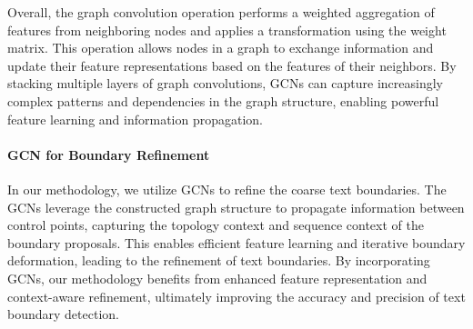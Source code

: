 Overall, the graph convolution operation performs a weighted aggregation of features from neighboring nodes and applies a transformation using the weight matrix. This operation allows nodes in a graph to exchange information and update their feature representations based on the features of their neighbors. By stacking multiple layers of graph convolutions, GCNs can capture increasingly complex patterns and dependencies in the graph structure, enabling powerful feature learning and information propagation.




\paragraph{GCN for Boundary Refinement}\hfill \break 
In our methodology, we utilize GCNs to refine the coarse text boundaries. The GCNs leverage the constructed graph structure to propagate information between control points, capturing the topology context and sequence context of the boundary proposals. This enables efficient feature learning and iterative boundary deformation, leading to the refinement of text boundaries. By incorporating GCNs, our methodology benefits from enhanced feature representation and context-aware refinement, ultimately improving the accuracy and precision of text boundary detection.


